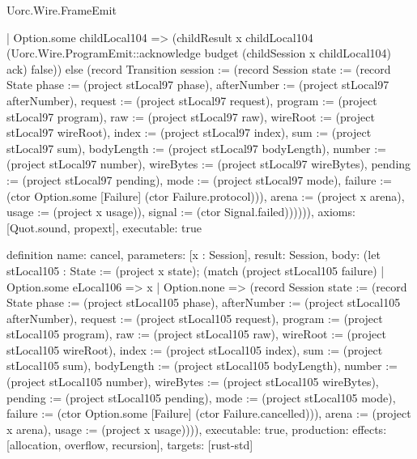 \begin{lexlean}{Uorc.Wire.FrameEmit}
\begin{semanticmodule}
{        | Option.some childLocal104 => (childResult x childLocal104 (Uorc.Wire.ProgramEmit::acknowledge budget (childSession x childLocal104) ack) false)) else (record Transition {session := (record Session {state := (record State {phase := (project stLocal97 phase), afterNumber := (project stLocal97 afterNumber), request := (project stLocal97 request), program := (project stLocal97 program), raw := (project stLocal97 raw), wireRoot := (project stLocal97 wireRoot), index := (project stLocal97 index), sum := (project stLocal97 sum), bodyLength := (project stLocal97 bodyLength), number := (project stLocal97 number), wireBytes := (project stLocal97 wireBytes), pending := (project stLocal97 pending), mode := (project stLocal97 mode), failure := (ctor Option.some [Failure] (ctor Failure.protocol))}), arena := (project x arena), usage := (project x usage)}), signal := (ctor Signal.failed)}))))),
  axioms: [Quot.sound, propext],
  executable: true
}

definition{
  name: cancel,
  parameters: [x : Session],
  result: Session,
  body: (let stLocal105 : State := (project x state); (match (project stLocal105 failure)
    | Option.some eLocal106 => x
    | Option.none => (record Session {state := (record State {phase := (project stLocal105 phase), afterNumber := (project stLocal105 afterNumber), request := (project stLocal105 request), program := (project stLocal105 program), raw := (project stLocal105 raw), wireRoot := (project stLocal105 wireRoot), index := (project stLocal105 index), sum := (project stLocal105 sum), bodyLength := (project stLocal105 bodyLength), number := (project stLocal105 number), wireBytes := (project stLocal105 wireBytes), pending := (project stLocal105 pending), mode := (project stLocal105 mode), failure := (ctor Option.some [Failure] (ctor Failure.cancelled))}), arena := (project x arena), usage := (project x usage)}))),
  executable: true,
  production: {effects: [allocation, overflow, recursion], targets: [rust-std]}
}


\end{semanticmodule}
\end{lexlean}
